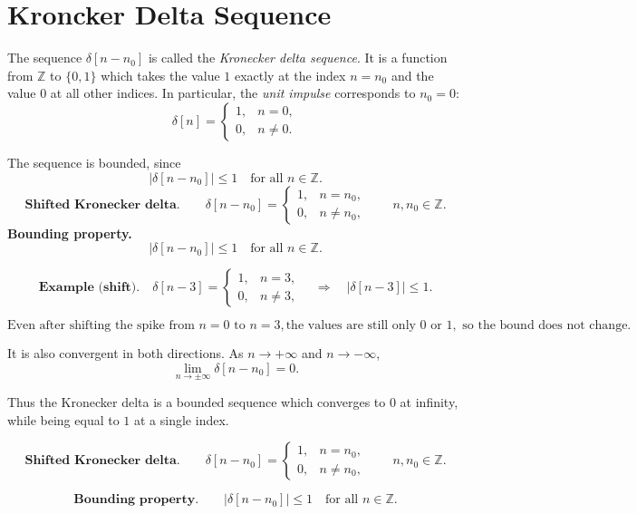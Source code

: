 \documentclass[12pt,a4paper]{article}
\begin{document}
	\section*{Kroncker Delta Sequence}
	
	
	The sequence $\delta[n-n_0]$ is called the \emph{Kronecker delta sequence}. It is a function from $\mathbb{Z}$ to $\{0,1\}$ which takes the value $1$ exactly at the index $n=n_0$ and the value $0$ at all other indices. In particular, the \emph{unit impulse} corresponds to $n_0=0$:
	$$
	\delta[n] =
	\begin{cases}
		1, & n=0, \\
		0, & n \neq 0.
	\end{cases}
	$$
	
	The sequence is bounded, since
	$$
	|\delta[n-n_0]| \leq 1 \quad \text{for all } n \in \mathbb{Z}.
	$$
	$$
	\textbf{Shifted Kronecker delta.}\qquad
	\delta[n-n_0]=
	\begin{cases}
		1, & n = n_0, \\
		0, & n \neq n_0 ,
	\end{cases}
	\qquad n,n_0 \in \mathbb{Z}.
	$$
	\textbf{Bounding property.}\qquad
	$$
	|\delta[n-n_0]| \leq 1 \quad \text{for all } n\in\mathbb{Z}.
	$$
	
	$$
	\textbf{Example (shift).}\quad
	\delta[n-3]=
	\begin{cases}
		1, & n=3,\\
		0, & n\neq 3,
	\end{cases}
	\quad \Rightarrow \quad
	|\delta[n-3]| \leq 1.
	$$
	
	$$
	\text{Even after shifting the spike from }n=0\text{ to }n=3,
	\text{the values are still only }0\text{ or }1,\text{ so the bound does not change.}
	$$
	
	
	It is also convergent in both directions. As $n \to +\infty$ and $n \to -\infty$,
	$$
	\lim_{n \to \pm \infty} \delta[n-n_0] = 0.
	$$
	
	Thus the Kronecker delta is a bounded sequence which converges to $0$ at infinity, while being equal to $1$ at a single index.\\ \quad
	
	$$
	\textbf{Shifted Kronecker delta.}\qquad
	\delta[n-n_0]=
	\begin{cases}
		1, & n = n_0, \\
		0, & n \neq n_0 ,
	\end{cases}
	\qquad n,n_0 \in \mathbb{Z}.
	$$
	
	$$
	\textbf{Bounding property.}\qquad
	|\delta[n-n_0]| \leq 1 \quad \text{for all } n\in\mathbb{Z}.
	$$
	
\end{document}
